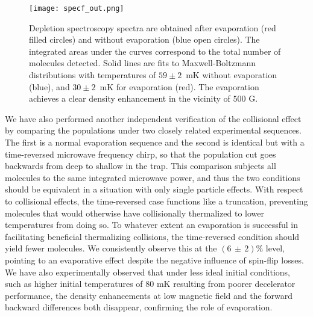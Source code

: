\documentclass[%
 reprint,
 amsmath,amssymb,
 aps,
pra,
]{revtex4-1}
\begin{document}
\begin{figure}[tb]
\texttt{[image: specf\_out.png]}%
\caption{
Depletion spectroscopy spectra are obtained after evaporation (red filled circles) and without evaporation (blue open circles). The integrated areas under the curves correspond to the total number of molecules detected. Solid lines are fits to Maxwell-Boltzmann distributions with temperatures of $59\pm2$~mK without evaporation (blue), and $30\pm2$~mK for evaporation (red). The evaporation achieves a clear density enhancement in the vicinity of $500\text{ G}$.
}
\label{fig:normenhance}
\end{figure}

We have also performed another independent verification of the collisional effect by comparing the populations under two closely related experimental sequences.
The first is a normal evaporation sequence and the second is identical but with a time-reversed microwave frequency chirp, so that the population cut goes backwards from deep to shallow in the trap.
This comparison subjects all molecules to the same integrated microwave power, and thus the two conditions should be equivalent in a situation with only single particle effects.
With respect to collisional effects, the time-reversed case functions like a truncation, preventing molecules that would otherwise have collisionally thermalized to lower temperatures from doing so.
To whatever extent an evaporation is successful in facilitating beneficial thermalizing collisions, the time-reversed condition should yield fewer molecules.
We consistently observe this at the $(6\,{\pm}\,2)\%$ level, pointing to an evaporative effect despite the negative influence of spin-flip losses.
We have also experimentally observed that under less ideal initial conditions, such as higher initial temperatures of $80\text{ mK}$ resulting from poorer decelerator performance, the density enhancements at low magnetic field and the forward backward differences both disappear, confirming the role of evaporation. 
\end{document}
